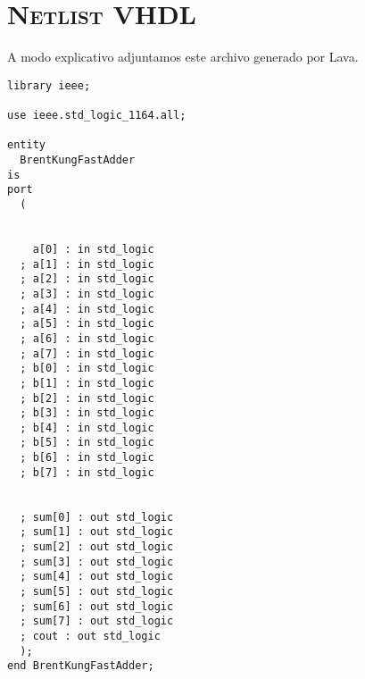 \chapter{\textsc{ Netlist VHDL }}\label{vhdlNetlist}
\noindent A modo explicativo adjuntamos este archivo generado por Lava.
\begin{lstlisting}
library ieee;

use ieee.std_logic_1164.all;

entity
  BrentKungFastAdder
is
port
  ( 
 
    
    a[0] : in std_logic
  ; a[1] : in std_logic
  ; a[2] : in std_logic
  ; a[3] : in std_logic
  ; a[4] : in std_logic
  ; a[5] : in std_logic
  ; a[6] : in std_logic
  ; a[7] : in std_logic
  ; b[0] : in std_logic
  ; b[1] : in std_logic
  ; b[2] : in std_logic
  ; b[3] : in std_logic
  ; b[4] : in std_logic
  ; b[5] : in std_logic
  ; b[6] : in std_logic
  ; b[7] : in std_logic

  
  ; sum[0] : out std_logic
  ; sum[1] : out std_logic
  ; sum[2] : out std_logic
  ; sum[3] : out std_logic
  ; sum[4] : out std_logic
  ; sum[5] : out std_logic
  ; sum[6] : out std_logic
  ; sum[7] : out std_logic
  ; cout : out std_logic
  );
end BrentKungFastAdder;


\end{lstlisting}
